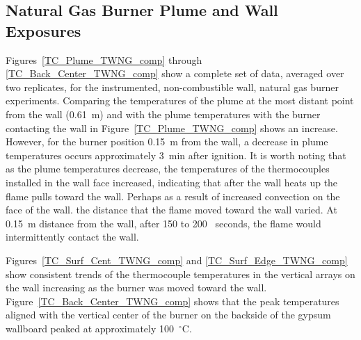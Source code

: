 \documentclass[twoside]{uocthesis}
\begin{document}
{\subsection{Natural Gas Burner Plume and Wall Exposures}
Figures~\ref{TC_Plume_TWNG_comp} through \ref{TC_Back_Center_TWNG_comp} show a complete set of data, averaged over two replicates, for the instrumented, non-combustible wall, natural gas burner experiments.  Comparing the temperatures of the plume at the most distant point from the wall (0.61~m) and with the plume temperatures with the burner contacting the wall in Figure~\ref{TC_Plume_TWNG_comp} shows an increase.  However, for the burner position 0.15~m from the wall, a decrease in plume temperatures occurs approximately 3~min after ignition.  It is worth noting that as the plume temperatures decrease, the temperatures of the thermocouples installed in the wall face increased, indicating that after the wall heats up the flame pulls toward the wall.  Perhaps as a result of increased convection on the face of the wall.  the distance that the flame moved toward the wall varied.  At 0.15~m distance from the wall, after 150 to 200~ seconds, the flame would intermittently contact the wall.  

Figures~\ref{TC_Surf_Cent_TWNG_comp} and \ref{TC_Surf_Edge_TWNG_comp} show consistent trends of the thermocouple temperatures in the vertical arrays on the wall increasing as the burner was moved toward the wall.  Figure~\ref{TC_Back_Center_TWNG_comp} shows that the peak temperatures aligned with the vertical center of the burner on the backside of the gypsum wallboard peaked at approximately 100~$^\circ$C.


}
\end{document}
